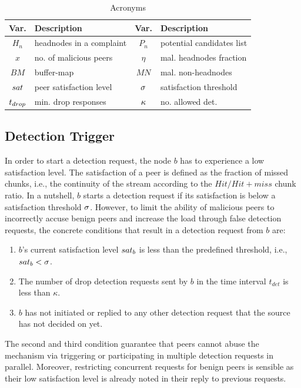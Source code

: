 \begin{table}[ht]
\center
\caption{Acronyms}
\begin{tabular}{|c|l||c|l|}
\hline

\bf{Var.} & \bf{Description}  & \bf{Var.} & \bf{Description} \\\hline\hline
$H_n$ & headnodes in a complaint & $P_n$ & potential candidates list \\\hline
$x$ & no. of malicious peers & $\eta$ & mal. headnodes fraction\\\hline
$BM$ & buffer-map & $MN$ & mal. non-headnodes \\\hline
$sat$ & peer satisfaction level & $\sigma$ & satisfaction threshold \\\hline
$t_{drop}$ & min. drop responses & $\kappa$ & no. allowed det. \\\hline
\end{tabular}
\label{tab:acronyms}
\end{table}

\subsection{Detection Trigger}
\label{Detection-Trigger}


In order to start a detection request, the node $b$ has to experience a low satisfaction level. 
The satisfaction of a peer is defined as the fraction of missed chunks, i.e., the continuity of the stream according to the $Hit/Hit+miss$ chunk ratio.
In a nutshell, $b$ starts a detection request if its satisfaction is below a satisfaction threshold $\sigma$.
However, to limit the ability of malicious peers to incorrectly accuse benign peers and increase the load through false detection requests, the concrete conditions that result in a detection request from $b$ are: 


\begin{enumerate}
 \item $b$'s current satisfaction level $sat_b$ is less than the predefined threshold, i.e., $sat_b < \sigma$.
 \item The number of drop detection requests sent by $b$ in the time interval $t_{det}$ is less than $\kappa$. 
 \item $b$ has not initiated or replied to any other \drop detection request that the source has not decided on yet.
\end{enumerate}
The second and third condition guarantee that peers cannot abuse the mechanism via triggering or participating in multiple detection requests in parallel. 
Moreover, restricting concurrent requests for benign peers is sensible as their low satisfaction level is already noted in their reply to previous requests.

